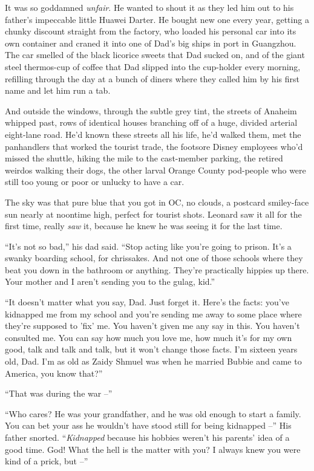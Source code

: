 It was so goddamned \emph{unfair}. He wanted to shout it as they
led him out to his father's impeccable little Huawei Darter. He
bought new one every year, getting a chunky discount straight from
the factory, who loaded his personal car into its own container and
craned it into one of Dad's big ships in port in Guangzhou. The car
smelled of the black licorice sweets that Dad sucked on, and of the
giant steel thermos-cup of coffee that Dad slipped into the
cup-holder every morning, refilling through the day at a bunch of
diners where they called him by his first name and let him run a
tab.

And outside the windows, through the subtle grey tint, the streets
of Anaheim whipped past, rows of identical houses branching off of
a huge, divided arterial eight-lane road. He'd known these streets
all his life, he'd walked them, met the panhandlers that worked the
tourist trade, the footsore Disney employees who'd missed the
shuttle, hiking the mile to the cast-member parking, the retired
weirdos walking their dogs, the other larval Orange County
pod-people who were still too young or poor or unlucky to have a
car.

The sky was that pure blue that you got in OC, no clouds, a
postcard smiley-face sun nearly at noontime high, perfect for
tourist shots. Leonard saw it all for the first time, really
\emph{saw} it, because he knew he was seeing it for the last time.

``It's not so bad,'' his dad said. ``Stop acting like you're going to
prison. It's a swanky boarding school, for chrissakes. And not one
of those schools where they beat you down in the bathroom or
anything. They're practically hippies up there. Your mother and I
aren't sending you to the gulag, kid.''

``It doesn't matter what you say, Dad. Just forget it. Here's the
facts: you've kidnapped me from my school and you're sending me
away to some place where they're supposed to 'fix' me. You haven't
given me any say in this. You haven't consulted me. You can say how
much you love me, how much it's for my own good, talk and talk and
talk, but it won't change those facts. I'm sixteen years old, Dad.
I'm as old as Zaidy Shmuel was when he married Bubbie and came to
America, you know that?''

``That was during the war --''

``Who cares? He was your grandfather, and he was old enough to start
a family. You can bet your ass he wouldn't have stood still for
being kidnapped --'' His father snorted. ``\emph{Kidnapped} because
his hobbies weren't his parents' idea of a good time. God! What the
hell is the matter with you? I always knew you were kind of a
prick, but --''

